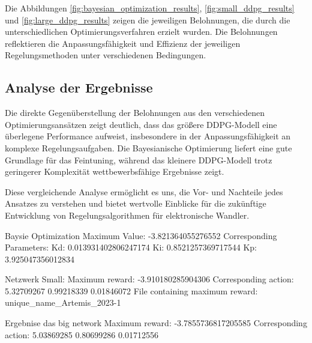 \clearpage %

Die Abbildungen \ref{fig:bayesian_optimization_results}, \ref{fig:small_ddpg_results} und \ref{fig:large_ddpg_results} zeigen die jeweiligen Belohnungen, die durch die unterschiedlichen Optimierungsverfahren erzielt wurden. Die Belohnungen reflektieren die Anpassungsfähigkeit und Effizienz der jeweiligen Regelungsmethoden unter verschiedenen Bedingungen.

\subsection{Analyse der Ergebnisse}
Die direkte Gegenüberstellung der Belohnungen aus den verschiedenen Optimierungsansätzen zeigt deutlich, dass das größere DDPG-Modell eine überlegene Performance aufweist, insbesondere in der Anpassungsfähigkeit an komplexe Regelungsaufgaben. Die Bayesianische Optimierung liefert eine gute Grundlage für das Feintuning, während das kleinere DDPG-Modell trotz geringerer Komplexität wettbewerbsfähige Ergebnisse zeigt.

Diese vergleichende Analyse ermöglicht es uns, die Vor- und Nachteile jedes Ansatzes zu verstehen und bietet wertvolle Einblicke für die zukünftige Entwicklung von Regelungsalgorithmen für elektronische Wandler.











Baysie Optimization
Maximum Value: -3.821364055276552
Corresponding Parameters:
Kd: 0.013931402806247174
Ki: 0.8521257369717544
Kp: 3.925047356012834


Netzwerk Small:
Maximum reward: -3.910180285904306
Corresponding action: 5.32709267 0.99218339 0.01846072
File containing maximum reward: unique_name_Artemis_2023-1

Ergebnise das big network 
Maximum reward: -3.7855736817205585
Corresponding action: 5.03869285 0.80699286 0.01712556

